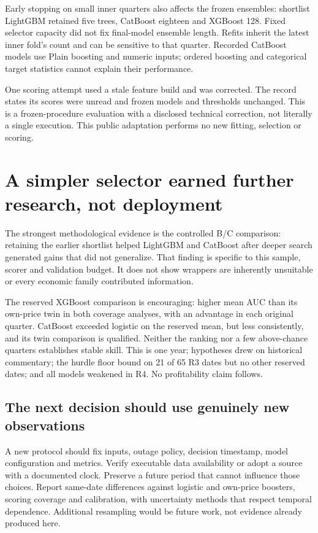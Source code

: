 \documentclass[11pt,a4paper]{article}
\begin{document}
Early stopping on small inner quarters also affects the frozen ensembles: shortlist LightGBM retained five trees, CatBoost eighteen and XGBoost 128. Fixed selector capacity did not fix final-model ensemble length. Refits inherit the latest inner fold's count and can be sensitive to that quarter. Recorded CatBoost models use Plain boosting and numeric inputs; ordered boosting and categorical target statistics cannot explain their performance.

One scoring attempt used a stale feature build and was corrected. The record states its scores were unread and frozen models and thresholds unchanged. This is a frozen-procedure evaluation with a disclosed technical correction, not literally a single execution. This public adaptation performs no new fitting, selection or scoring.

\nextpage
\section*{A simpler selector earned further research, not deployment}
The strongest methodological evidence is the controlled B/C comparison: retaining the earlier shortlist helped LightGBM and CatBoost after deeper search generated gains that did not generalize. That finding is specific to this sample, scorer and validation budget. It does not show wrappers are inherently unsuitable or every economic family contributed information.

The reserved XGBoost comparison is encouraging: higher mean AUC than its own-price twin in both coverage analyses, with an advantage in each original quarter. CatBoost exceeded logistic on the reserved mean, but less consistently, and its twin comparison is qualified. Neither the ranking nor a few above-chance quarters establishes stable skill. This is one year; hypotheses drew on historical commentary; the hurdle floor bound on 21 of 65 R3 dates but no other reserved dates; and all models weakened in R4. No profitability claim follows.

\subsection*{The next decision should use genuinely new observations}
A new protocol should fix inputs, outage policy, decision timestamp, model configuration and metrics. Verify executable data availability or adopt a source with a documented clock. Preserve a future period that cannot influence those choices. Report same-date differences against logistic and own-price boosters, scoring coverage and calibration, with uncertainty methods that respect temporal dependence. Additional resampling would be future work, not evidence already produced here.
\end{document}
